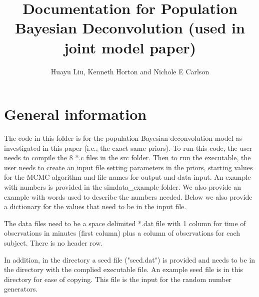 \documentclass[12pt, oneside]{article}   	%
\begin{document}
\title{Documentation for Population Bayesian Deconvolution (used in joint model paper)}
\author{Huayu Liu, Kenneth Horton and Nichole E Carlson}
\date{}
\maketitle

\section{General information}
The code in this folder is for the population Bayesian deconvolution model as investigated in this paper (i.e., the exact same priors).  To run this code, the user needs to compile the 8 *.c files in the src folder. Then to run the executable, the user needs to create an input file setting parameters in the priors, starting values for the MCMC algorithm and file names for output and data input. An example with numbers is provided in the simdata\_example folder. We also provide an example with words used to describe the numbers needed. Below we also provide a dictionary for the values that need to be in the input file.

The data files need to be a space delimited *.dat file with 1 column for time of observations in minutes (first column) plus a column of observations for each subject. There is no header row.

In addition, in the directory a seed file ("seed.dat") is provided and needs to be in the directory with the complied executable file.  An example seed file is in this directory for ease of copying.  This file is the input for the random number generators.
\end{document}
